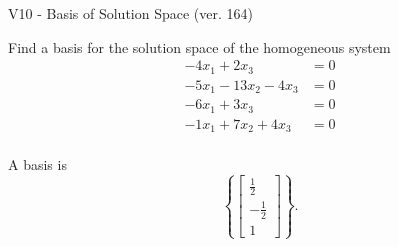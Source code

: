 \begin{exercise}
  \begin{exerciseTitle}V10 - Basis of Solution Space (ver. 164)\end{exerciseTitle}
  \begin{exerciseStatement}
    Find a basis for the solution space of the homogeneous system 
\begin{align*}
 -4 x_ 1 + 2 x_ 3 &= 0  \\ 
  -5 x_ 1 -13 x_ 2 -4 x_ 3 &= 0  \\ 
  -6 x_ 1 + 3 x_ 3 &= 0  \\ 
  -1 x_ 1 + 7 x_ 2 + 4 x_ 3 &= 0  \\ 
 \end{align*}


 
  \end{exerciseStatement}

  \begin{exerciseAnswer}
   A basis is   
\[\left\{\left[\begin{array}{c}
\frac{1}{2} \\
-\frac{1}{2} \\
1
\end{array}\right]\right\}.\]

  


  \end{exerciseAnswer}
\end{exercise}